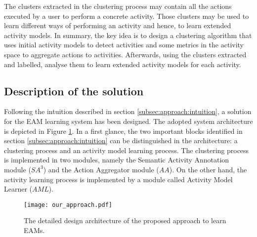 The clusters extracted in the clustering process may contain all the actions executed by a user to perform a concrete activity. Those clusters may be used to learn different ways of performing an activity and hence, to learn extended activity models. In summary, the key idea is to design a clustering algorithm that uses initial activity models to detect activities and some metrics in the activity space to aggregate actions to activities. Afterwards, using the clusters extracted and labelled, analyse them to learn extended activity models for each activity.


\subsection{Description of the solution}
Following the intuition described in section \ref{subsec:approach:intuition}, a solution for the EAM learning system has been designed. The adopted system architecture is depicted in Figure \ref{fig-design}. In a first glance, the two important blocks identified in section \ref{subsec:approach:intuition} can be distinguished in the architecture: a clustering process and an activity model learning process. The clustering process is implemented in two modules, namely the Semantic Activity Annotation module ($SA^3$) and the Action Aggregator module ($AA$). On the other hand, the activity learning process is implemented by a module called Activity Model Learner ($AML$). 

\begin{figure}[htbp]
\centering
\texttt{[image: our\_approach.pdf]}
    \caption{The detailed design architecture of the proposed approach to learn EAMs.}
    \label{fig-design}
\end{figure}

